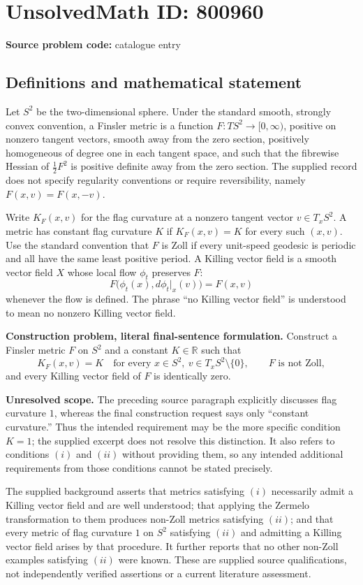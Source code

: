 \documentclass[11pt]{article}
\newcommand{\R}{\mathbb{R}}
\begin{document}
\section*{UnsolvedMath ID: 800960}
\textbf{Source problem code:} catalogue entry
\subsection{Definitions and mathematical statement}
Let \(S^2\) be the two-dimensional sphere. Under the standard smooth, strongly convex convention, a Finsler metric is a function \(F:TS^2\to[0,\infty)\), positive on nonzero tangent vectors, smooth away from the zero section, positively homogeneous of degree one in each tangent space, and such that the fibrewise Hessian of \(\tfrac12F^2\) is positive definite away from the zero section. The supplied record does not specify regularity conventions or require reversibility, namely \(F(x,v)=F(x,-v)\).

Write \(K_F(x,v)\) for the flag curvature at a nonzero tangent vector \(v\in T_xS^2\). A metric has constant flag curvature \(K\) if \(K_F(x,v)=K\) for every such \((x,v)\). Use the standard convention that \(F\) is Zoll if every unit-speed geodesic is periodic and all have the same least positive period. A Killing vector field is a smooth vector field \(X\) whose local flow \(\phi_t\) preserves \(F\):
\[
F\bigl(\phi_t(x),d\phi_t|_x(v)\bigr)=F(x,v)
\]
whenever the flow is defined. The phrase ``no Killing vector field'' is understood to mean no nonzero Killing vector field.

\textbf{Construction problem, literal final-sentence formulation.} Construct a Finsler metric \(F\) on \(S^2\) and a constant \(K\in\R\) such that
\[
K_F(x,v)=K\quad\text{for every }x\in S^2,\ v\in T_xS^2\setminus\{0\},
\qquad F\text{ is not Zoll},
\]
and every Killing vector field of \(F\) is identically zero.

\textbf{Unresolved scope.} The preceding source paragraph explicitly discusses flag curvature \(1\), whereas the final construction request says only ``constant curvature.'' Thus the intended requirement may be the more specific condition \(K=1\); the supplied excerpt does not resolve this distinction. It also refers to conditions \((i)\) and \((ii)\) without providing them, so any intended additional requirements from those conditions cannot be stated precisely.

The supplied background asserts that metrics satisfying \((i)\) necessarily admit a Killing vector field and are well understood; that applying the Zermelo transformation to them produces non-Zoll metrics satisfying \((ii)\); and that every metric of flag curvature \(1\) on \(S^2\) satisfying \((ii)\) and admitting a Killing vector field arises by that procedure. It further reports that no other non-Zoll examples satisfying \((ii)\) were known. These are supplied source qualifications, not independently verified assertions or a current literature assessment.
\end{document}

